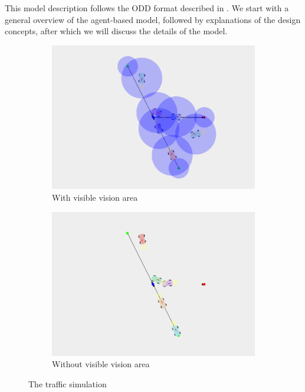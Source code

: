 
This model description follows the ODD format described in \textcite{grimm2006standard}. We start with a general overview of the agent-based model, followed by explanations of the design concepts, after which we will discuss the details of the model. 

\begin{figure}
	\centering
	\begin{subfigure}{0.49\textwidth}
		\centering
		\includegraphics[width=\textwidth]{./img/simulationView1}
		\caption{With visible vision area}
		\label{fig:model:simulation:fix}
	\end{subfigure}
	\begin{subfigure}{0.49\textwidth}
		\centering
		\includegraphics[width=\textwidth]{./img/simulationView2}
		\caption{Without visible vision area}
		\label{fig:model:simulation:nofix}
	\end{subfigure}	
	\caption{The traffic simulation}
	\label{fig:model:simulation}
\end{figure}

